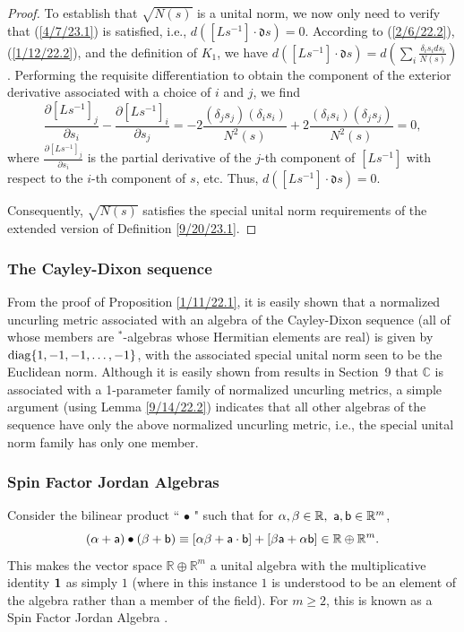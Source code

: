 \documentclass{amsart}
\numberwithin{equation}{section}
\theoremstyle{definition}
\numberwithin{theorem}{section}
\begin{document}
\begin{proof}
 To establish that $\sqrt{N(s)}$ is a unital norm, we  now only need to verify that (\ref{4/7/23.1}) is satisfied, i.e., $d\left([Ls^{-1}]\cdot \mathfrak{d}s\right)=0$.  According to (\ref{2/6/22.2}), (\ref{1/12/22.2}), and the definition  of $K_1$, we have $d\left([Ls^{-1}]\cdot \mathfrak{d}s\right) = d\left(\sum_i \frac{\delta_is_i ds_i}{N(s)}\right)$.  Performing the requisite differentiation to obtain the component of the exterior derivative associated with a choice of $i$ and $j$, we find \[ \frac{\partial [Ls^{-1}]_j}{\partial s_i} - \frac{\partial [Ls^{-1}]_i}{\partial s_j} = -2\frac{(\delta_j s_j)(\delta_i s_i)}{N^2(s)} +
2\frac{(\delta_i s_i)(\delta_j s_j)}{N^2(s)} = 0,  \] where $\frac{\partial [Ls^{-1}]_j}{\partial s_i}$ is the partial derivative of the $j$-th component of $[Ls^{-1}]$ with respect to the $i$-th component of $s$, etc. Thus,  $d\left([Ls^{-1}]\cdot \mathfrak{d}s\right) = 0$.

Consequently, $\sqrt{N(s)}$ satisfies the special unital norm requirements of the extended version of Definition \ref{9/20/23.1}.  
\end{proof}


\subsubsection{The Cayley-Dixon sequence}  From the proof of Proposition \ref{1/11/22.1}, it is easily shown that a normalized uncurling metric associated with an algebra of the Cayley-Dixon sequence (all of whose members are $^*$-algebras whose Hermitian elements are real) is given by ${\rm diag}\{1,-1,-1,\dots,-1\}$, with the associated special unital norm seen to be the Euclidean norm. Although it is easily shown from results in \mbox{Section 9} that $\mathbb{C}$ is associated with a 1-parameter family of normalized uncurling metrics, a simple argument (using Lemma \ref{9/14/22.2}) indicates that all other algebras of the sequence have only the above normalized uncurling metric, i.e., the special unital norm family has only one member.  
 
\subsubsection{Spin Factor Jordan Algebras}  Consider the bilinear product ``$\,\bullet\,$" such that for
$\alpha,\beta\in \mathbb{R},\,\, {\sf a},{\sf b}\in \mathbb{R}^m$,  \begin{equation}  (\alpha+ {\sf a})\bullet (\beta + {\sf b}) \equiv
    [\alpha \beta + {\sf a} \cdot {\sf b}] + [ \beta {\sf a} + \alpha {\sf b}] \in \mathbb{R}\oplus \mathbb{R}^m. \label{12/24/18.1}\end{equation}  This makes the vector space $\mathbb{R}\oplus \mathbb{R}^m$ a unital algebra with the multiplicative identity ${\bf 1}$ as simply $1$ (where in this instance $1$ is understood to be an element of the algebra rather than a member of the field).  For $m\ge 2$, this is known as a Spin Factor Jordan Algebra \cite{mccrimmon:2004}.
\end{document}
